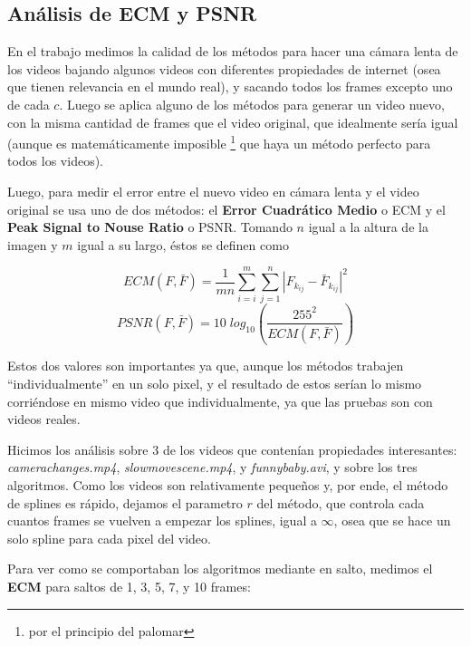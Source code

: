 \subsection {An\'alisis de ECM y PSNR}

En el trabajo medimos la calidad de los m\'etodos para hacer una c\'amara lenta
de los videos bajando algunos videos con diferentes propiedades de internet
(osea que tienen relevancia en el mundo real), y sacando todos los frames
excepto uno de cada $c$. Luego se aplica alguno de los m\'etodos para generar un
video nuevo, con la misma cantidad de frames que el video original, que
idealmente ser\'ia igual (aunque es matem\'aticamente imposible \footnote{por el
principio del palomar} que haya un m\'etodo perfecto para todos los videos).

Luego, para medir el error entre el nuevo video en c\'amara lenta y el video
original se usa uno de dos m\'etodos: el \textbf{Error Cuadr\'atico Medio} o ECM
y el \textbf{Peak Signal to Nouse Ratio} o PSNR. Tomando $n$ igual a la altura 
de la imagen y $m$ igual a su largo, \'estos se definen como

\[
ECM(F, \bar{F}) = \frac{1}{m n} \sum^m_{i = i} \sum^n_{j = 1} \left| F_{k_{i j}} - \bar{F}_{k_{i j}} \right|^2
\]
\[
PSNR(F, \bar{F}) = 10 \; log_{10} \left( \frac{255^2}{ECM(F, \bar{F})} \right)
\]

Estos dos valores son importantes ya que, aunque los m\'etodos trabajen
``individualmente'' en un solo pixel, y el resultado de estos ser\'ian lo mismo
corri\'endose en mismo video que individualmente, ya que las pruebas son con videos
reales.

Hicimos los an\'alisis sobre 3 de los videos que conten\'ian propiedades
interesantes: \textit{camerachanges.mp4}, \textit{slowmovescene.mp4}, y
\textit{funnybaby.avi}, y sobre los tres algoritmos. Como los videos son
relativamente peque\~nos y, por ende, el m\'etodo de splines es r\'apido,
dejamos el parametro $r$ del m\'etodo, que controla cada cuantos frames se
vuelven a empezar los splines, igual a $\infty$, osea que se hace un solo spline
para cada pixel del video.

Para ver como se comportaban los algoritmos mediante en salto, medimos el
\textbf{ECM} para saltos de 1, 3, 5, 7, y 10 frames:

